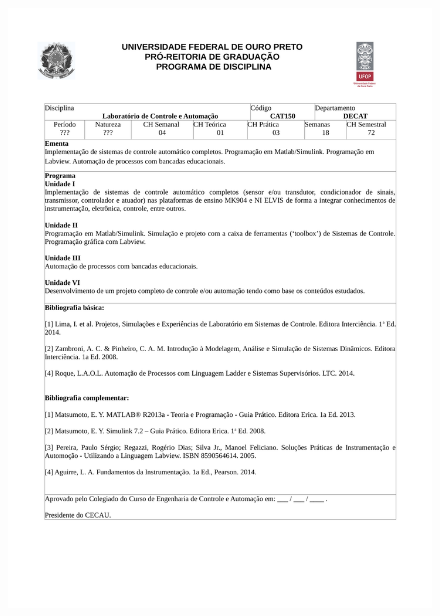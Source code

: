 \begin{figure}[p]
	\centering 
	\includegraphics[scale=0.7]{capitulos/anexo1-programas-disciplina/eg21.pdf}
\end{figure}

